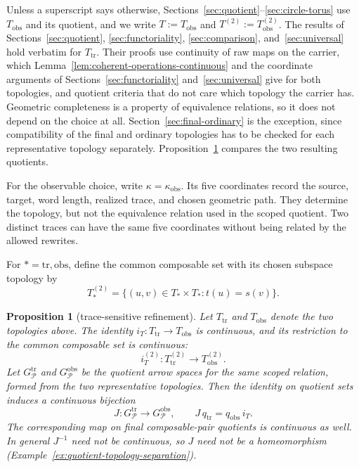 \documentclass[10pt,reqno]{amsart}
\theoremstyle{definition}
\theoremstyle{plain}
\newtheorem{proposition}[definition]{Proposition}
\theoremstyle{remark}
\begin{document}
Unless a superscript says otherwise, Sections~\ref{sec:quotient}--\ref{sec:circle-torus} use $T_{\mathrm{obs}}$ and
its quotient, and we write $T:=T_{\mathrm{obs}}$ and
$T^{(2)}:=T_{\mathrm{obs}}^{(2)}$.  The results of Sections~\ref{sec:quotient}, \ref{sec:functoriality}, \ref{sec:comparison}, and~\ref{sec:universal}
hold verbatim for $T_{\mathrm{tr}}$.  Their proofs use continuity of raw maps
on the carrier, which Lemma~\ref{lem:coherent-operations-continuous} and the
coordinate arguments of Sections~\ref{sec:functoriality} and~\ref{sec:universal} give for both topologies, and
quotient criteria that do not care which topology the carrier has.  Geometric
completeness is a property of equivalence relations, so it does not depend on
the choice at all.  Section~\ref{sec:final-ordinary} is the exception, since compatibility of the
final and ordinary topologies has to be checked for each representative
topology separately.  Proposition~\ref{prop:trace-sensitive-refinement}
compares the two resulting quotients.

For the observable choice, write $\kappa=\kappa_{\mathrm{obs}}$.
Its five coordinates record the source, target, word length, realized trace,
and chosen geometric path.  They determine the topology, but not the
equivalence relation used in the scoped quotient.  Two distinct traces can
have the same five coordinates without being related by the allowed rewrites.

For $*=\mathrm{tr},\mathrm{obs}$, define the common composable set with its
chosen subspace topology by
\[
  T_*^{(2)}=\{(u,v)\in T_*\times T_*:t(u)=s(v)\}.
\]

\begin{proposition}[trace-sensitive refinement]
\label{prop:trace-sensitive-refinement}
Let $T_{\mathrm{tr}}$ and $T_{\mathrm{obs}}$ denote the two topologies above.
The identity $i_T:T_{\mathrm{tr}}\to T_{\mathrm{obs}}$ is continuous, and its
restriction to the common composable set is continuous:
\[
  i_T^{(2)}:T_{\mathrm{tr}}^{(2)}\longrightarrow T_{\mathrm{obs}}^{(2)}.
\]
Let $G_{\mathcal P}^{\mathrm{tr}}$ and $G_{\mathcal P}^{\mathrm{obs}}$ be
the quotient arrow spaces for the same scoped relation, formed from the two
representative topologies.  Then the identity on quotient sets induces a
continuous bijection
\[
  J:G_{\mathcal P}^{\mathrm{tr}}\longrightarrow G_{\mathcal P}^{\mathrm{obs}},
  \qquad J\,q_{\mathrm{tr}}=q_{\mathrm{obs}}\,i_T.
\]
The corresponding map on final composable-pair quotients is continuous as
well.  In general $J^{-1}$ need not be continuous, so $J$ need not be a
homeomorphism (Example~\ref{ex:quotient-topology-separation}).
\end{proposition}
\end{document}
